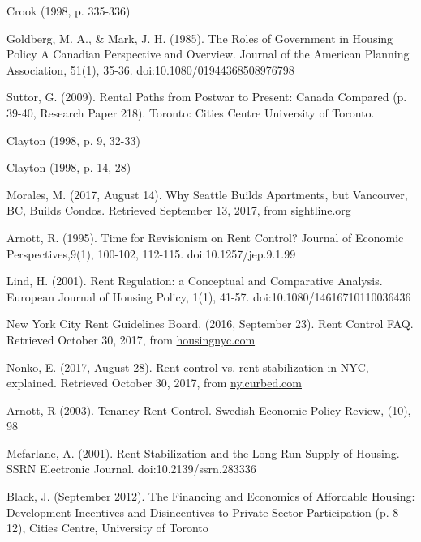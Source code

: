 \begin{thebibliography}{9}
 Crook (1998, p. 335-336)

 Goldberg, M. A., \& Mark, J. H. (1985). The Roles of Government in Housing Policy A Canadian Perspective and Overview. Journal of the American Planning Association, 51(1), 35-36. doi:10.1080/01944368508976798

 Suttor, G. (2009). Rental Paths from Postwar to Present: Canada Compared (p. 39-40, Research Paper 218). Toronto: Cities Centre University of Toronto.

 Clayton (1998, p. 9, 32-33)
  

 Clayton (1998, p. 14, 28) 

  Morales, M. (2017, August 14). Why Seattle Builds Apartments, but Vancouver, BC, Builds Condos. Retrieved September 13, 2017, from \href{http://www.sightline.org/2017/08/14/why-seattle-builds-apartments-but-vancouver-bc-builds-condos/}{sightline.org}


   Arnott, R. (1995). Time for Revisionism on Rent Control? Journal of Economic Perspectives,9(1), 100-102, 112-115. doi:10.1257/jep.9.1.99

  Lind, H. (2001). Rent Regulation: a Conceptual and Comparative Analysis. European Journal of Housing Policy, 1(1), 41-57. doi:10.1080/14616710110036436

  New York City Rent Guidelines Board. (2016, September 23). Rent Control FAQ. Retrieved October 30, 2017, from \href{http://www.housingnyc.com/html/resources/faq/rentcontrol.html}{housingnyc.com}

  Nonko, E. (2017, August 28). Rent control vs. rent stabilization in NYC, explained. Retrieved October 30, 2017, from \href{https://ny.curbed.com/2017/8/28/16214506/nyc-apartments-housing-rent-control}{ny.curbed.com}

  Arnott, R (2003). Tenancy Rent Control. Swedish Economic Policy Review, (10), 98

  Mcfarlane, A. (2001). Rent Stabilization and the Long-Run Supply of Housing. SSRN Electronic Journal. doi:10.2139/ssrn.283336

  Black, J. (September 2012). The Financing and Economics of Affordable Housing: Development Incentives and Disincentives to Private-Sector Participation (p. 8-12), Cities Centre, University of Toronto


\end{thebibliography}
